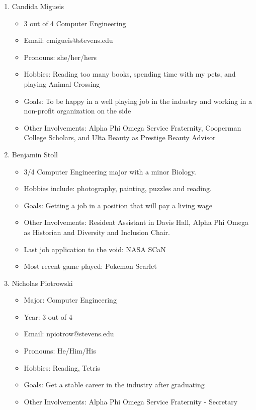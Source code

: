 \begin{enumerate}
    \item Candida Migueis
        \begin{itemize}
            \item 3 out of 4 Computer Engineering
            \item Email: cmigueis@stevens.edu
            \item Pronouns: she/her/hers
            \item Hobbies: Reading too many books, spending time with my pets, and playing Animal Crossing
            \item Goals: To be happy in a well playing job in the industry and working in a non-profit organization on the side
            \item Other Involvements: Alpha Phi Omega Service Fraternity, Cooperman College Scholars, and Ulta Beauty as Prestige Beauty Advisor
        \end{itemize}
    \item Benjamin Stoll
        \begin{itemize}
            \item 3/4 Computer Engineering major with a minor Biology. 
            \item Hobbies include: photography, painting, puzzles and reading.
            \item Goals: Getting a job in a position that will pay a living wage
            \item Other Involvements: Resident Assistant in Davis Hall, Alpha Phi Omega as Historian and Diversity and Inclusion Chair.
            \item Last job application to the void: NASA SCaN
            \item Most recent game played: Pokemon Scarlet
        \end{itemize}
    \item Nicholas Piotrowski
        \begin{itemize}
            \item Major: Computer Engineering
            \item Year: 3 out of 4
            \item Email: npiotrow@stevens.edu
            \item Pronouns: He/Him/His
            \item Hobbies: Reading, Tetris
            \item Goals: Get a stable career in the industry after graduating
            \item Other Involvements: Alpha Phi Omega Service Fraternity - Secretary
        \end{itemize}
\end{enumerate}
